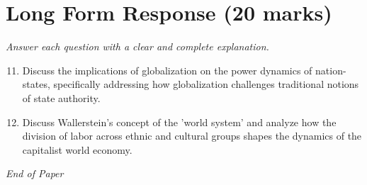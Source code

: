\documentclass[12pt]{article}
\begin{document}
\section*{Long Form Response (20 marks)}
\textit{Answer each question with a clear and complete explanation.}
\begin{enumerate}[label=\arabic*.]
\setcounter{enumi}{10}
\item Discuss the implications of globalization on the power dynamics of nation-states, specifically addressing how globalization challenges traditional notions of state authority.
\item Discuss Wallerstein's concept of the 'world system' and analyze how the division of labor across ethnic and cultural groups shapes the dynamics of the capitalist world economy.
\end{enumerate}

\vfill
\noindent\textit{End of Paper}
\end{document}
